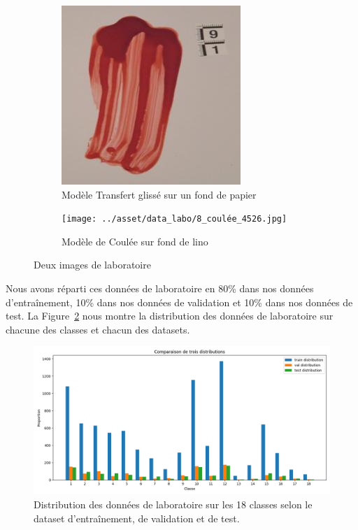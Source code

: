 \documentclass[a4paper]{article}
\begin{document}
\begin{figure}[ht]
    \centering
    \begin{subfigure}{0.40\linewidth}
        \centering
        \includegraphics[width=\linewidth]{../asset/data_labo/4_papier_1586.jpg}
        \caption{Modèle Transfert glissé sur un fond de papier}
    \end{subfigure}
    \begin{subfigure}{0.40\linewidth}
        \centering
        \texttt{[image: ../asset/data\_labo/8\_coulée\_4526.jpg]}
        \caption{Modèle de Coulée sur fond de lino}
    \end{subfigure}
    \caption{Deux images de laboratoire}
    \label{fig: labs images}
\end{figure}

Nous avons réparti ces données de laboratoire en 80\% dans nos données d'entraînement, 10\% dans nos données de validation et 10\% dans nos données de test. La Figure~\ref{fig:distribution labo} nous montre la distribution des données de laboratoire sur chacune des classes et chacun des datasets.

\begin{figure}[ht]
    \centering
    \includegraphics[width=0.8\linewidth]{../asset/distribution_train_val_test.png}
    \caption{Distribution des données de laboratoire sur les 18 classes selon le dataset d'entraînement, de validation et de test.}
    \label{fig:distribution labo}
\end{figure}
\end{document}
